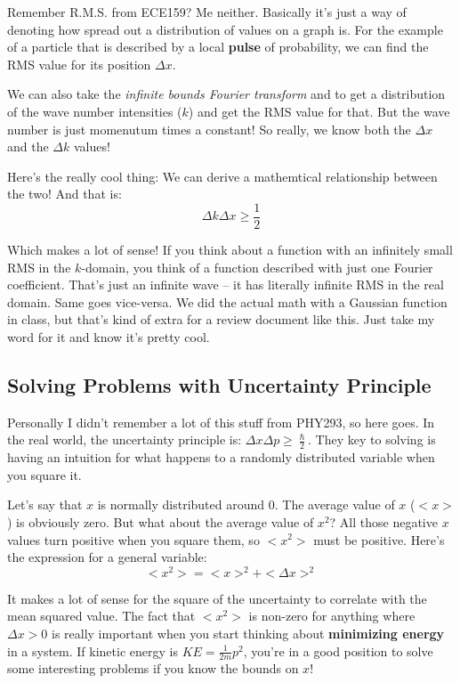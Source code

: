 \documentclass[a4paper,12pt]{report}
\begin{document}
Remember R.M.S. from ECE159? Me neither. Basically it's just a way of denoting how spread out a distribution of values on a graph is. For the example of a particle that is described by a local \textbf{pulse} of probability, we can find the RMS value for its position $\Delta x$. 

We can also take the \textit{infinite bounds Fourier transform} and to get a distribution of the wave number intensities ($k$) and get the RMS value for that. But the wave number is just momenutum times a constant! So really, we know both the $\Delta x$ and the $\Delta k$ values! 

Here's the really cool thing: We can derive a mathemtical relationship between the two! And that is: $$\Delta k \Delta x \geq \frac{1}{2}$$


Which makes a lot of sense! If you think about a function with an infinitely small RMS in the $k$-domain, you think of a function described with just one Fourier coefficient. That's just an infinite wave -- it has literally infinite RMS in the real domain. Same goes vice-versa. We did the actual math with a Gaussian function in class, but that's kind of extra for a review document like this. Just take my word for it and know it's pretty cool.


\subsection{Solving Problems with Uncertainty Principle}

Personally I didn't remember a lot of this stuff from PHY293, so here goes. In the real world, the uncertainty principle is: $\Delta x \Delta p \geq \frac{\hslash}{2}$. They key to solving is having an intuition for what happens to a randomly distributed variable when you square it. 

Let's say that $x$ is normally distributed around $0$. The average value of $x$ ($<x>$) is obviously zero. But what about the average value of $x^2$? All those negative $x$ values turn positive when you square them, so $<x^2>$ must be positive. Here's the expression for a general variable: 
$$<x^2> = <x>^2 + <\Delta x>^2$$

It makes a lot of sense for the square of the uncertainty to correlate with the mean squared value. The fact that $<x^2>$ is non-zero for anything where $\Delta x > 0$ is really important when you start thinking about \textbf{minimizing energy} in a system. If kinetic energy is $KE = \frac{1}{2m}p^2$, you're in a good position to solve some interesting problems if you know the bounds on $x$!
\end{document}
